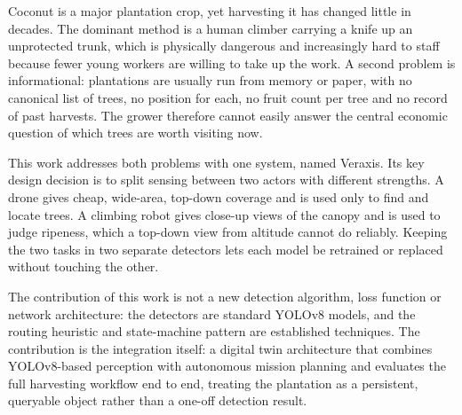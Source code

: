 \documentclass[10pt,a4paper]{article}
\newcommand{\irjsec}[1]{\par\vspace{6pt}\noindent{\cambria\bfseries\fontsize{12}{14}\selectfont\textbullet~#1}\par\vspace{3pt}}
\begin{document}
\irjsec{INTRODUCTION}
Coconut is a major plantation crop, yet harvesting it has changed little in decades. The dominant method is a human climber carrying a knife up an unprotected trunk, which is physically dangerous and increasingly hard to staff because fewer young workers are willing to take up the work. A second problem is informational: plantations are usually run from memory or paper, with no canonical list of trees, no position for each, no fruit count per tree and no record of past harvests. The grower therefore cannot easily answer the central economic question of which trees are worth visiting now.

This work addresses both problems with one system, named Veraxis. Its key design decision is to split sensing between two actors with different strengths. A drone gives cheap, wide-area, top-down coverage and is used only to find and locate trees. A climbing robot gives close-up views of the canopy and is used to judge ripeness, which a top-down view from altitude cannot do reliably. Keeping the two tasks in two separate detectors lets each model be retrained or replaced without touching the other.

The contribution of this work is not a new detection algorithm, loss function or network architecture: the detectors are standard YOLOv8 models, and the routing heuristic and state-machine pattern are established techniques. The contribution is the integration itself: a digital twin architecture that combines YOLOv8-based perception with autonomous mission planning and evaluates the full harvesting workflow end to end, treating the plantation as a persistent, queryable object rather than a one-off detection result.
\end{document}
